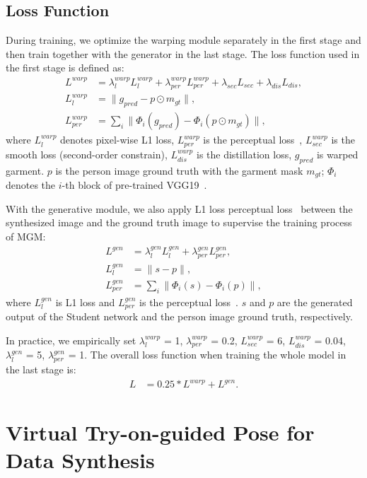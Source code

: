 \subsection{Loss Function}
During training, we optimize the warping module separately in the first stage and then train together with the generator in the last stage. The loss function used in the first stage is defined as:
\begin{align}
    L^{warp} & = \lambda^{warp}_{l}L^{warp}_{l} + \lambda^{warp}_{per}L^{warp}_{per} + \lambda_{sec}L_{sec} + \lambda_{dis}L_{dis},\\
    L^{warp}_{l} & = \|g_{pred} - p \odot m_{gt}\|,\\
    L^{warp}_{per} & = \sum_i{\|\Phi_i(g_{pred}) - \Phi_i(p \odot m_{gt})\|},
\end{align}
where $L^{warp}_{l}$ denotes pixel-wise L1 loss, $L^{warp}_{per}$ is the perceptual loss~\cite{Johnson-ECCV2016-Perceptual}, $L^{warp}_{sec}$ is the smooth loss (second-order constrain), $L^{warp}_{dis}$ is the distillation loss, $g_{pred}$ is warped garment.  $p$ is the person image ground truth with the garment mask $m_{gt}$; $\Phi_i$ denotes the $i$-th block of pre-trained VGG19~\cite{Simonyan-ArXiv2014-VGG}.

With the generative module, we also apply L1 loss perceptual loss~\cite{Johnson-ECCV2016-Perceptual} between the synthesized image and the ground truth image to supervise the training process of MGM:
\begin{align}
    L^{gen} & = \lambda^{gen}_{l}L^{gen}_{l} + \lambda^{gen}_{per}L^{gen}_{per},\\
    L^{gen}_{l} & = \|s - p\|,\\
    L^{gen}_{per} & = \sum_i{\|\Phi_i(s) - \Phi_i(p)\|},
\end{align}
where $L^{gen}_{l}$ is L1 loss and $L^{gen}_{per}$ is the perceptual loss~\cite{Johnson-ECCV2016-Perceptual}. $s$ and $p$ are the generated output of the Student network and the person image ground truth, respectively. 

In practice, we empirically set $\lambda^{warp}_{l}$ = 1, $\lambda^{warp}_{per}$ = 0.2, $L^{warp}_{sec}$ = 6, $L^{warp}_{dis}$ = 0.04, $\lambda^{gen}_{l}$ = 5,
 $\lambda^{gen}_{per}$ = 1. The overall loss function 
when training the whole model in the last stage is:
\begin{align}
    L & = 0.25*L^{warp} + L^{gen}.
\end{align}

\section{Virtual Try-on-guided Pose for Data Synthesis}

